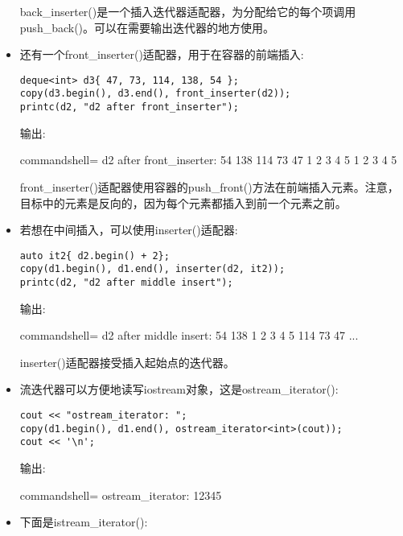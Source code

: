 \begin{itemize}
back\_inserter()是一个插入迭代器适配器，为分配给它的每个项调用push\_back()。可以在需要输出迭代器的地方使用。

\item 
还有一个front\_inserter()适配器，用于在容器的前端插入:

\begin{lstlisting}[style=styleCXX]
deque<int> d3{ 47, 73, 114, 138, 54 };
copy(d3.begin(), d3.end(), front_inserter(d2));
printc(d2, "d2 after front_inserter");
\end{lstlisting}

输出:

\begin{tcblisting}{commandshell={}}
d2 after front_inserter: 54 138 114 73 47 1 2 3 4 5 1 2 3 4 5
\end{tcblisting}

front\_inserter()适配器使用容器的push\_front()方法在前端插入元素。注意，目标中的元素是反向的，因为每个元素都插入到前一个元素之前。

\item 
若想在中间插入，可以使用inserter()适配器:

\begin{lstlisting}[style=styleCXX]
auto it2{ d2.begin() + 2};
copy(d1.begin(), d1.end(), inserter(d2, it2));
printc(d2, "d2 after middle insert");
\end{lstlisting}

输出:

\begin{tcblisting}{commandshell={}}
d2 after middle insert: 54 138 1 2 3 4 5 114 73 47 ...
\end{tcblisting}

inserter()适配器接受插入起始点的迭代器。

\item 
流迭代器可以方便地读写iostream对象，这是ostream\_iterator():

\begin{lstlisting}[style=styleCXX]
cout << "ostream_iterator: ";
copy(d1.begin(), d1.end(), ostream_iterator<int>(cout));
cout << '\n';
\end{lstlisting}

输出:

\begin{tcblisting}{commandshell={}}
ostream_iterator: 12345
\end{tcblisting}

\item 
下面是istream\_iterator():


\end{itemize}
